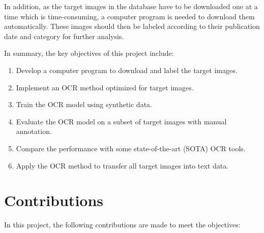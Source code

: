 \documentclass[12pt,twoside]{report}
\begin{document}
In addition, as the target images in the database \cite{fnzzpages} have to be downloaded one at a time which is time-consuming, a computer program is needed to download them automatically. These images should then be labeled according to their publication date and category for further analysis.

In summary, the key objectives of this project include:

\begin{enumerate}
    \item Develop a computer program to download and label the target images.
    \item Implement an OCR method optimized for target images.
    \item Train the OCR model using synthetic data.
    \item Evaluate the OCR model on a subset of target images with manual annotation.
    \item Compare the performance with some state-of-the-art (SOTA) OCR tools.
    \item Apply the OCR method to transfer all target images into text data.
\end{enumerate}

\section{Contributions}
In this project, the following contributions are made to meet the objectives:
\end{document}
